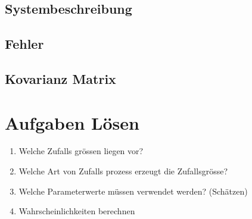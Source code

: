 \documentclass[../Main.tex]{subfiles}
\begin{document}
\subsection{Systembeschreibung}
\subsection{Fehler}
\subsection{Kovarianz Matrix}

\section{Aufgaben Lösen}
\begin{enumerate}
    \item Welche Zufalls grössen liegen vor?
    \item Welche Art von Zufalls prozess erzeugt die Zufallsgrösse?
    \item Welche Parameterwerte müssen verwendet werden? (Schätzen)
    \item Wahrscheinlichkeiten berechnen
\end{enumerate}
\end{document}
